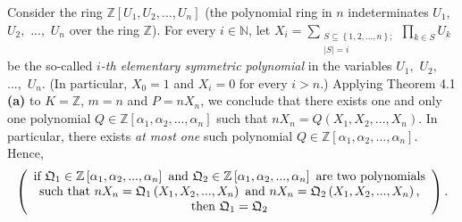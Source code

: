 \documentclass[numbers=enddot,12pt,final,onecolumn,notitlepage]{scrartcl}%
\begin{document}
Consider the ring $\mathbb{Z}\left[  U_{1},U_{2},...,U_{n}\right]  $ (the
polynomial ring in $n$ indeterminates $U_{1},$ $U_{2},$ $...,$ $U_{n}$ over
the ring $\mathbb{Z}$). For every $i\in\mathbb{N}$, let $X_{i}=\sum
\limits_{\substack{S\subseteq\left\{  1,2,...,n\right\}  ;\\\left\vert
S\right\vert =i}}\prod\limits_{k\in S}U_{k}$ be the so-called $i$\textit{-th
elementary symmetric polynomial} in the variables $U_{1},$ $U_{2},$ $...,$
$U_{n}$. (In particular, $X_{0}=1$ and $X_{i}=0$ for every $i>n$.) Applying
Theorem 4.1 \textbf{(a)} to $K=\mathbb{Z}$, $m=n$ and $P=nX_{n}$, we conclude
that there exists one and only one polynomial $Q\in\mathbb{Z}\left[
\alpha_{1},\alpha_{2},...,\alpha_{n}\right]  $ such that $nX_{n}=Q\left(
X_{1},X_{2},...,X_{n}\right)  $. In particular, there exists \textit{at most
one} such polynomial $Q\in\mathbb{Z}\left[  \alpha_{1},\alpha_{2}%
,...,\alpha_{n}\right]  $. Hence,
\begin{equation}
\left(
\begin{array}
[c]{c}%
\text{if }\mathfrak{Q}_{1}\in\mathbb{Z}\left[  \alpha_{1},\alpha
_{2},...,\alpha_{n}\right]  \text{ and }\mathfrak{Q}_{2}\in\mathbb{Z}\left[
\alpha_{1},\alpha_{2},...,\alpha_{n}\right]  \text{ are two polynomials}\\
\text{such that }nX_{n}=\mathfrak{Q}_{1}\left(  X_{1},X_{2},...,X_{n}\right)
\text{ and }nX_{n}=\mathfrak{Q}_{2}\left(  X_{1},X_{2},...,X_{n}\right)
\text{,}\\
\text{then }\mathfrak{Q}_{1}=\mathfrak{Q}_{2}%
\end{array}
\right)  . \label{9.7.pf1}%
\end{equation}
\end{document}
